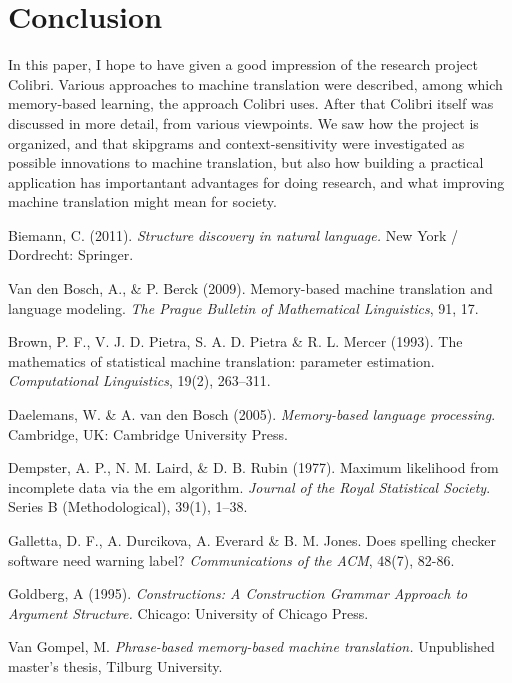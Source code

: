 \documentclass[12pt]{article}
\begin{document}
\section{Conclusion}
In this paper, I hope to have given a good impression of the research project Colibri. Various approaches to machine translation were described, among which memory-based learning, the approach Colibri uses. After that Colibri itself was discussed in more detail, from various viewpoints. We saw how the project is organized, and that skipgrams and context-sensitivity were investigated as possible innovations to machine translation, but also how building a practical application has importantant advantages for doing research, and what improving machine translation might mean for society.

\begin{thebibliography}{99}

Biemann, C. (2011). \emph{Structure discovery in natural language.} New York / Dordrecht: Springer.

Van den Bosch, A., \& P. Berck (2009). Memory-based machine translation and language modeling. \emph{The Prague Bulletin of Mathematical Linguistics}, 91, 17.

Brown, P. F., V. J. D. Pietra, S. A. D. Pietra \& R. L. Mercer (1993). The mathematics of statistical machine translation: parameter estimation. \emph{Computational Linguistics}, 19(2), 263–311.

Daelemans, W. \& A. van den Bosch (2005). \emph{Memory-based language processing}. Cambridge, UK: Cambridge University Press.

Dempster, A. P., N. M. Laird, \& D. B. Rubin (1977). Maximum likelihood from incomplete data via the em algorithm. \emph{Journal of the Royal Statistical Society}. Series B (Methodological), 39(1), 1–38.

Galletta, D. F., A. Durcikova, A. Everard \& B. M. Jones. Does spelling checker software need warning label? \emph{Communications of the ACM}, 48(7), 82-86.

Goldberg, A (1995). \emph{Constructions: A Construction Grammar Approach to Argument Structure.} Chicago: University of Chicago Press.

Van Gompel, M. \emph{Phrase-based memory-based machine translation.} Unpublished
master's thesis, Tilburg University.


\end{thebibliography}
\end{document}
